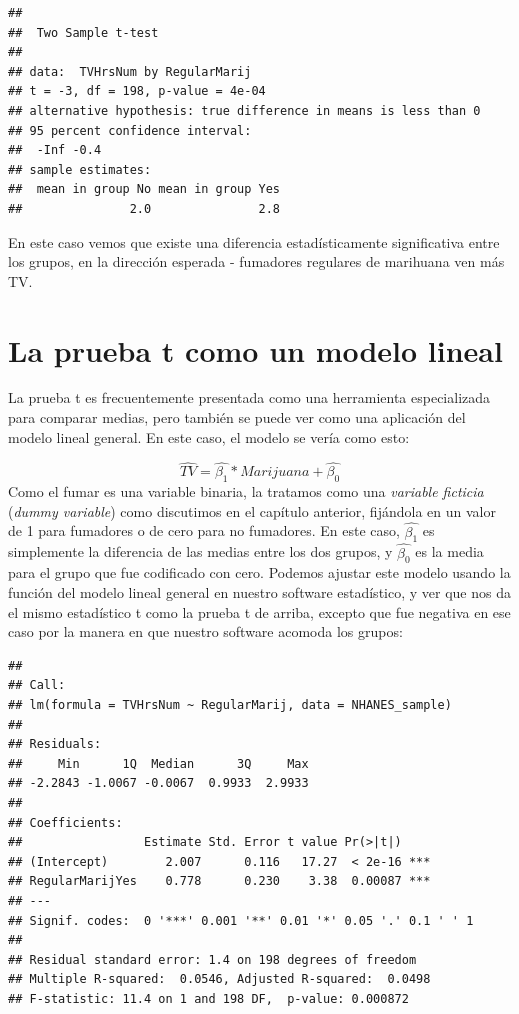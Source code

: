 \documentclass[
  12pt,
]{book}
\theoremstyle{definition}
\theoremstyle{definition}
\theoremstyle{definition}
\theoremstyle{remark}
\begin{document}
\begin{verbatim}
## 
## 	Two Sample t-test
## 
## data:  TVHrsNum by RegularMarij
## t = -3, df = 198, p-value = 4e-04
## alternative hypothesis: true difference in means is less than 0
## 95 percent confidence interval:
##  -Inf -0.4
## sample estimates:
##  mean in group No mean in group Yes 
##               2.0               2.8
\end{verbatim}

En este caso vemos que existe una diferencia estadísticamente significativa entre los grupos, en la dirección esperada - fumadores regulares de marihuana ven más TV.

\hypertarget{ttest-linear-model}{%
\section{La prueba t como un modelo lineal}\label{ttest-linear-model}}

La prueba t es frecuentemente presentada como una herramienta especializada para comparar medias, pero también se puede ver como una aplicación del modelo lineal general. En este caso, el modelo se vería como esto:

\[
\hat{TV} = \hat{\beta_1}*Marijuana + \hat{\beta_0}
\]
Como el fumar es una variable binaria, la tratamos como una \emph{variable ficticia} (\emph{dummy variable}) como discutimos en el capítulo anterior, fijándola en un valor de 1 para fumadores o de cero para no fumadores. En este caso, \(\hat{\beta_1}\) es simplemente la diferencia de las medias entre los dos grupos, y \(\hat{\beta_0}\) es la media para el grupo que fue codificado con cero. Podemos ajustar este modelo usando la función del modelo lineal general en nuestro software estadístico, y ver que nos da el mismo estadístico t como la prueba t de arriba, excepto que fue negativa en ese caso por la manera en que nuestro software acomoda los grupos:

\begin{verbatim}
## 
## Call:
## lm(formula = TVHrsNum ~ RegularMarij, data = NHANES_sample)
## 
## Residuals:
##     Min      1Q  Median      3Q     Max 
## -2.2843 -1.0067 -0.0067  0.9933  2.9933 
## 
## Coefficients:
##                 Estimate Std. Error t value Pr(>|t|)    
## (Intercept)        2.007      0.116   17.27  < 2e-16 ***
## RegularMarijYes    0.778      0.230    3.38  0.00087 ***
## ---
## Signif. codes:  0 '***' 0.001 '**' 0.01 '*' 0.05 '.' 0.1 ' ' 1
## 
## Residual standard error: 1.4 on 198 degrees of freedom
## Multiple R-squared:  0.0546,	Adjusted R-squared:  0.0498 
## F-statistic: 11.4 on 1 and 198 DF,  p-value: 0.000872
\end{verbatim}
\end{document}
